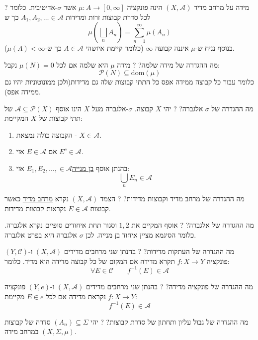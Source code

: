 \documentclass{tstextbook}
\begin{document}
?
מידה על מרחב מדיד \(\left( X,\mathcal{A} \right)\) הינה פונקציה \(\mu:A\to \left[ 0,\infty \right]\) אשר \(\sigma\)-אדיטיבית. כלומר לכל סדרת קבוצות זרות ומדידות \(A_{1},A_{2},\dots \in \mathcal{A}\) כך ש
$$\mu\left( \bigsqcup_{n} A_{n} \right)=\sum_{n=1}^{\infty}\mu(A_{n})$$
בנוסף נניח ש-\(\mu\) איננה קבועה \(\infty\) (כלומר קיימת איזשהי \(A \in \mathcal{ A}\) כך ש-\(\mu(A)< \infty\)).

מה ההגדרה של מידה שלמה?
?
מידה \(\mu\) היא שלמה אם לכל \(\mu(N)=0\) נקבל:
$$\mathcal{P}\left( N \right) \subseteq \mathrm{dom}\left( \mu \right) $$
כלומר עבור כל קבוצה ממידה אפס כל התתי קבוצות שלה גם מדידות(ולכן ממונוטוניות יהיו גם ממידה אפס).

מה ההגדרה של \(\sigma\) אלגברה?
?
יהי \(X\) קבוצה. \(\sigma\)-אלגברה מעל \(X\) הינו אוסף \(\mathcal{A}\subseteq \mathcal{P}(X)\) של תתי קבוצות של \(X\) המקיימת:

\begin{enumerate}
  \item הקבוצה כולה נמצאת - \(X \in \mathcal{A}\). 


  \item אם \(E \in \mathcal{A}\) אזי \(E^{c} \in \mathcal{A}\). 


  \item בהנתן אוסף \underline{בן מנייה}\(E_{1}, E_{2},\dots, \in \mathcal{A}\) אזי: 
$$\bigcup_{n}E_{n}\in \mathcal{A}$$


\end{enumerate}
מה ההגדרה של מרחב מדיד וקבוצות מדידות?
?
הצמד \((X,\mathcal{A})\) נקרא \underline{מרחב מדיד} כאשר קבוצות \(E \in \mathcal{A}\) נקראות \underline{קבוצות מדידות}.

מה ההגדרה של אלגברה?
?
אוסף המקיים את \(1,2\) וסגור תחת איחודים סופיים נקרא אלגברה. כלומר הסיגמא מציין איחוד בן מנייה. לכן \(\sigma\) אלגברה היא בפרט אלגברה.

מה ההגדרה של העתקות מדידות?
?
בהנתן שני מרחבים מדידים \((X,\mathcal{A})\) ו-\(\left( Y,\mathcal{C} \right)\) פונקציה \(f:X\to Y\) תקרא מדידה אם המקום של כל קבוצה מדידה הוא מדיד. כלומר:
$$\forall E \in \mathcal{C} \qquad f^{-1}(E)\in \mathcal{A}$$

מה ההגדרה של פונקציה מדידה?
?
בהנתן שני מרחבים מדידים \((X,\mathcal{A})\) ו-\((Y,e)\) פונקציה \(f:X\to Y\) נקראת מדידה אם לכל \(E \in e\) מקיימת:
$$f^{-1} (E) \in \mathcal{A}$$

מה ההגדרה של גבול עליון ותחתון של סדרת קבוצות?
?
יהי \((A_{n})\subseteq \Sigma\) סדרה של קבוצות במרחב מידה \(\left( X,\Sigma,\mu \right)\). 
\end{document}
